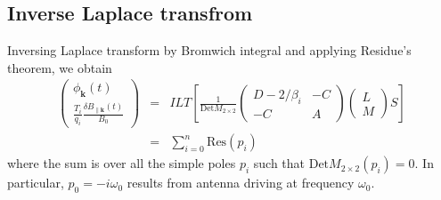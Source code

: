 \documentclass[12pt]{article}
\begin{document}
\subsection{Inverse Laplace transfrom}
Inversing Laplace transform by Bromwich integral and applying Residue's theorem, we obtain
\begin{eqnarray}
\begin{pmatrix}
\phi_{\mathbf{k}} (t)\\
\frac{T_i}{q_i} \frac{\delta B_{\parallel \mathbf{k}}(t)}{B_0} 
\end{pmatrix}
&= &
ILT\left[
\frac{1}{\mathrm{Det}M_{2\times2}}
\begin{pmatrix}
D-2/\beta_i  & -C\\
-C & A
\end{pmatrix}
\begin{pmatrix}
L\\
M
\end{pmatrix}
 S
\right] \nonumber \\
&=&\sum_{i=0}^n \mathrm{Res}(p_i)
\end{eqnarray}
where the sum is over all the simple poles $p_i$ such that $\mathrm{Det}M_{2\times2}(p_i) = 0$. In particular, $p_0 = -i\omega_0$ results from antenna driving at frequency $\omega_0$.
\end{document}
